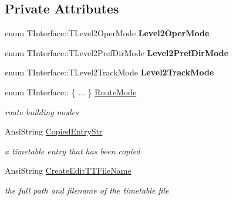 \subsection*{Private Attributes}
\begin{DoxyCompactItemize}
\item 
\mbox{\label{class_t_interface_acc34535dff01791ef58902149bde9600}} 
enum T\+Interface\+::\+T\+Level2\+Oper\+Mode {\bfseries Level2\+Oper\+Mode}
\item 
\mbox{\label{class_t_interface_a2b1566ea2090139a6dcbc3629c1435c2}} 
enum T\+Interface\+::\+T\+Level2\+Pref\+Dir\+Mode {\bfseries Level2\+Pref\+Dir\+Mode}
\item 
\mbox{\label{class_t_interface_abef396b4120848159aedde23ba697630}} 
enum T\+Interface\+::\+T\+Level2\+Track\+Mode {\bfseries Level2\+Track\+Mode}
\item 
\mbox{\label{class_t_interface_ad95a6b6c3485ed9270839d12240ab4cf}} 
enum T\+Interface\+:: \{ ... \}  \mbox{\hyperlink{class_t_interface_ad95a6b6c3485ed9270839d12240ab4cf}{Route\+Mode}}
\begin{DoxyCompactList}\small\item\em route building modes \end{DoxyCompactList}\item 
\mbox{\label{class_t_interface_a96f26034858fa594f151c7e8ed36c09e}} 
Ansi\+String \mbox{\hyperlink{class_t_interface_a96f26034858fa594f151c7e8ed36c09e}{Copied\+Entry\+Str}}
\begin{DoxyCompactList}\small\item\em a timetable entry that has been copied \end{DoxyCompactList}\item 
\mbox{\label{class_t_interface_afb89eda9fd1b5b36f39310de2903d455}} 
Ansi\+String \mbox{\hyperlink{class_t_interface_afb89eda9fd1b5b36f39310de2903d455}{Create\+Edit\+T\+T\+File\+Name}}
\begin{DoxyCompactList}\small\item\em the full path and filename of the timetable file \end{DoxyCompactList}\item 

\end{DoxyCompactItemize}
